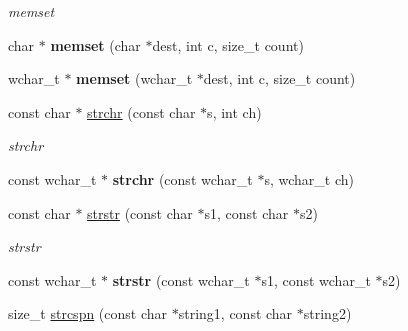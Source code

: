 \begin{DoxyCompactItemize}
\begin{DoxyCompactList}\small\item\em memset \end{DoxyCompactList}\item 
\hypertarget{namespacestring__util_a4a6bd4ad0f654fff0a4ee630f1326640}{char $\ast$ {\bfseries memset} (char $\ast$dest, int c, size\-\_\-t count)}\label{namespacestring__util_a4a6bd4ad0f654fff0a4ee630f1326640}

\item 
\hypertarget{namespacestring__util_a860f9c92e013f2863060669bbe05973b}{wchar\-\_\-t $\ast$ {\bfseries memset} (wchar\-\_\-t $\ast$dest, int c, size\-\_\-t count)}\label{namespacestring__util_a860f9c92e013f2863060669bbe05973b}

\item 
\hypertarget{namespacestring__util_aa88a0930241b7add7546b649ebec855d}{const char $\ast$ \hyperlink{namespacestring__util_aa88a0930241b7add7546b649ebec855d}{strchr} (const char $\ast$s, int ch)}\label{namespacestring__util_aa88a0930241b7add7546b649ebec855d}

\begin{DoxyCompactList}\small\item\em strchr \end{DoxyCompactList}\item 
\hypertarget{namespacestring__util_a70588ea01a35282892b8f0c281a5bb1c}{const wchar\-\_\-t $\ast$ {\bfseries strchr} (const wchar\-\_\-t $\ast$s, wchar\-\_\-t ch)}\label{namespacestring__util_a70588ea01a35282892b8f0c281a5bb1c}

\item 
\hypertarget{namespacestring__util_a38b1bffbbcea43e28d6f821a69f89a4b}{const char $\ast$ \hyperlink{namespacestring__util_a38b1bffbbcea43e28d6f821a69f89a4b}{strstr} (const char $\ast$s1, const char $\ast$s2)}\label{namespacestring__util_a38b1bffbbcea43e28d6f821a69f89a4b}

\begin{DoxyCompactList}\small\item\em strstr \end{DoxyCompactList}\item 
\hypertarget{namespacestring__util_aee6bbad266f06165b7e306039b73ba6d}{const wchar\-\_\-t $\ast$ {\bfseries strstr} (const wchar\-\_\-t $\ast$s1, const wchar\-\_\-t $\ast$s2)}\label{namespacestring__util_aee6bbad266f06165b7e306039b73ba6d}

\item 
\hypertarget{namespacestring__util_a9d8e7142b076ef57e4dc89f329c828fe}{size\-\_\-t \hyperlink{namespacestring__util_a9d8e7142b076ef57e4dc89f329c828fe}{strcspn} (const char $\ast$string1, const char $\ast$string2)}\label{namespacestring__util_a9d8e7142b076ef57e4dc89f329c828fe}


\end{DoxyCompactItemize}
